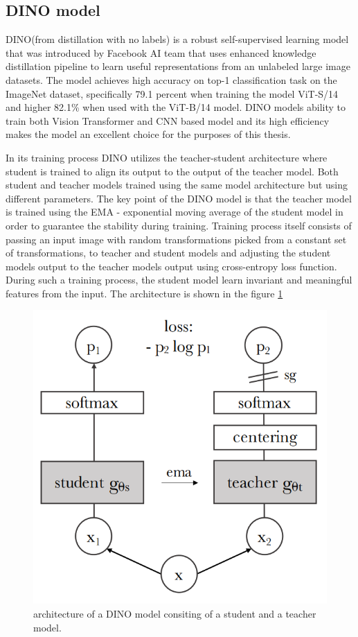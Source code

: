 \subsection{DINO model}
\label{dino}
DINO(from distillation with no labels) is a robust self-supervised learning model that was introduced by Facebook AI team that uses enhanced knowledge distillation pipeline to learn useful representations from an unlabeled large image datasets. The model achieves high accuracy on top-1 classification task on the ImageNet dataset, specifically 79.1 percent when training the model ViT-S/14 and higher 82.1\% when used with the ViT-B/14 model. DINO models ability to train both Vision Transformer and CNN based model and its high efficiency makes the model an excellent choice for the purposes of this thesis.

In its training process DINO utilizes the teacher-student architecture where student is trained to align its output to the output of the teacher model. Both student and teacher models trained using the same model architecture but using different parameters. The key point of the DINO model is that the teacher model is trained using the EMA - exponential moving average of the student model in order to guarantee the stability during training. Training process itself consists of passing an input image with random transformations picked from a constant set of transformations, to teacher and student models and adjusting the student models output to the teacher models output using cross-entropy loss function. During such a training process, the student model learn invariant and meaningful features from the input. The architecture is shown in the figure \ref{fig:dino}

\begin{figure}[h]
	\begin{center}
		\includegraphics[width=0.5\linewidth]{Chapter_2/dino.png}
	\end{center}
	\caption{architecture of a DINO model consiting of a student and a teacher model.}
	\label{fig:dino}
\end{figure}

